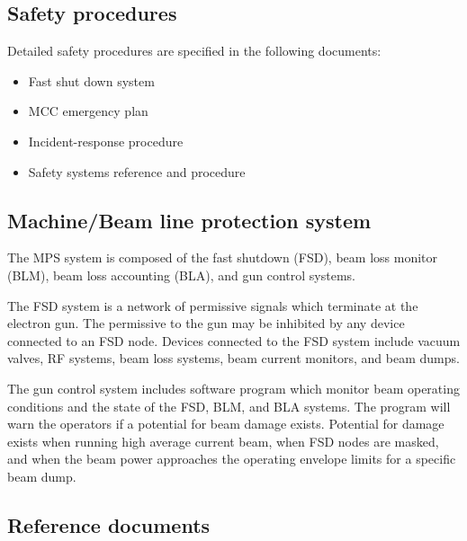 {\subsection{Safety procedures}

Detailed safety procedures are specified in the following documents:

\begin{itemize}
\item{Fast shut down system}
\item{MCC emergency plan}
\item{Incident-response procedure}
\item{Safety systems reference and procedure}
\end{itemize}

\subsection{Machine/Beam line protection system}

The MPS system is composed of the fast shutdown (FSD), beam loss
monitor (BLM), beam loss accounting (BLA), and gun control systems.

The FSD system is a network of permissive signals which terminate
at the electron gun. The permissive to the gun may be inhibited by any 
device connected to an FSD node.
Devices connected to the FSD system include vacuum valves, RF
systems, beam loss systems, beam current monitors, and beam dumps.

The gun control system includes software program which monitor
beam operating conditions and the state of the FSD, BLM, and BLA systems.
The program will warn the operators if a potential for beam damage
exists. Potential for damage exists when running high average current
beam, when FSD nodes are masked, and when the beam power approaches
the operating envelope limits for a specific beam dump.

\subsection{Reference documents}

}
